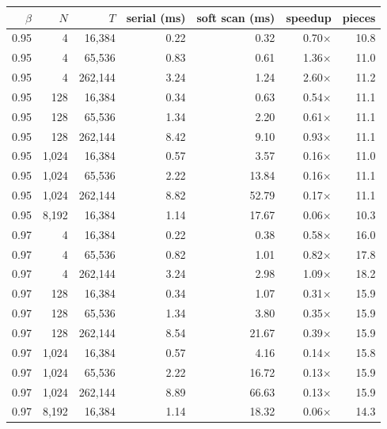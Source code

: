 \begin{tabular}{rrrrrrr}
\toprule
$\beta$ & $N$ & $T$ & serial (ms) & soft scan (ms) & speedup & pieces\\
\midrule
0.95 & 4 & 16{,}384 & 0.22 & 0.32 & 0.70$\times$ & 10.8\\
0.95 & 4 & 65{,}536 & 0.83 & 0.61 & 1.36$\times$ & 11.0\\
0.95 & 4 & 262{,}144 & 3.24 & 1.24 & 2.60$\times$ & 11.2\\
0.95 & 128 & 16{,}384 & 0.34 & 0.63 & 0.54$\times$ & 11.1\\
0.95 & 128 & 65{,}536 & 1.34 & 2.20 & 0.61$\times$ & 11.1\\
0.95 & 128 & 262{,}144 & 8.42 & 9.10 & 0.93$\times$ & 11.1\\
0.95 & 1{,}024 & 16{,}384 & 0.57 & 3.57 & 0.16$\times$ & 11.0\\
0.95 & 1{,}024 & 65{,}536 & 2.22 & 13.84 & 0.16$\times$ & 11.1\\
0.95 & 1{,}024 & 262{,}144 & 8.82 & 52.79 & 0.17$\times$ & 11.1\\
0.95 & 8{,}192 & 16{,}384 & 1.14 & 17.67 & 0.06$\times$ & 10.3\\
0.97 & 4 & 16{,}384 & 0.22 & 0.38 & 0.58$\times$ & 16.0\\
0.97 & 4 & 65{,}536 & 0.82 & 1.01 & 0.82$\times$ & 17.8\\
0.97 & 4 & 262{,}144 & 3.24 & 2.98 & 1.09$\times$ & 18.2\\
0.97 & 128 & 16{,}384 & 0.34 & 1.07 & 0.31$\times$ & 15.9\\
0.97 & 128 & 65{,}536 & 1.34 & 3.80 & 0.35$\times$ & 15.9\\
0.97 & 128 & 262{,}144 & 8.54 & 21.67 & 0.39$\times$ & 15.9\\
0.97 & 1{,}024 & 16{,}384 & 0.57 & 4.16 & 0.14$\times$ & 15.8\\
0.97 & 1{,}024 & 65{,}536 & 2.22 & 16.72 & 0.13$\times$ & 15.9\\
0.97 & 1{,}024 & 262{,}144 & 8.89 & 66.63 & 0.13$\times$ & 15.9\\
0.97 & 8{,}192 & 16{,}384 & 1.14 & 18.32 & 0.06$\times$ & 14.3\\
\bottomrule
\end{tabular}
